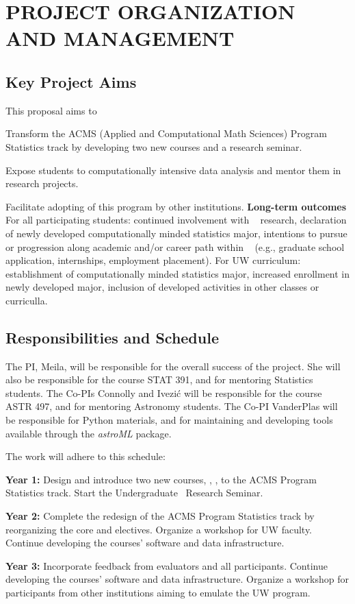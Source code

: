 
\section{    {\bf        PROJECT ORGANIZATION AND MANAGEMENT         }}
\label{plan}

\subsection{                      Key Project Aims                   }
\label{sec:key-aims}
 
This proposal aims to 
\bits
\item Transform the ACMS (Applied and Computational Math Sciences) Program Statistics track
by developing two new courses and a research seminar. 
\item Expose students to computationally intensive data analysis and mentor them in research projects. 
\item Facilitate adopting of this program by other institutions.
\eits  
{\bf Long-term outcomes} For all participating students: 
continued involvement with \cdse~ research, 
declaration of newly developed computationally minded statistics major,
intentions to pursue or progression along academic and/or career path within \cdse~ (e.g., graduate school application, internships, employment placement). 
For UW curriculum: establishment of computationally minded statistics major,
increased enrollment in newly developed major, inclusion of developed activities in other classes or curriculla.


\subsection{Responsibilities and Schedule}

The PI, Meila, will be responsible for the overall success of the project. She will also be 
responsible for the course STAT 391, and for mentoring Statistics students. The Co-PIs 
Connolly and Ivezi\'{c} will be responsible for the course ASTR 497, and for mentoring 
Astronomy students. The Co-PI VanderPlas will be responsible for Python materials, 
and for maintaining and developing tools available through the {\it astroML} package. 

The work will adhere to this schedule: 
\bits
\item {\bf  Year 1:} Design and introduce two new courses, \statcl, \astrocl, to
the ACMS Program Statistics track. Start the Undergraduate \cdse\ Research Seminar. 
\item {\bf Year 2:} Complete the redesign of the ACMS Program Statistics track
by reorganizing the core and electives. Organize a workshop for UW faculty. 
Continue developing the courses' software and data infrastructure. 
\item {\bf Year 3:} Incorporate feedback from evaluators and all participants. 
Continue developing the courses' software and data infrastructure. 
Organize a workshop for participants from other institutions aiming to 
emulate the UW program.
\eits

